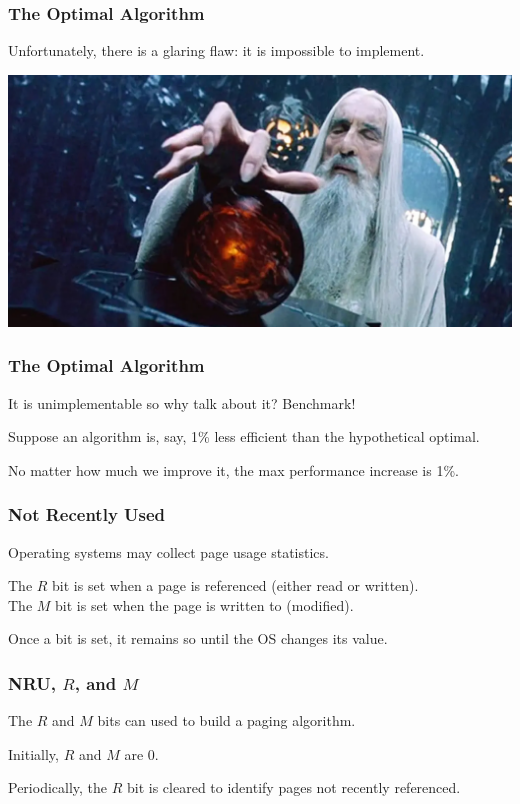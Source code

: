 \begin{frame}
\frametitle{The Optimal Algorithm}

Unfortunately, there is a glaring flaw: it is impossible to implement. 

\begin{center}
	\includegraphics[width=\textwidth]{images/palantir.jpg}
\end{center}

\end{frame}

\begin{frame}
\frametitle{The Optimal Algorithm}

It is unimplementable so why talk about it? Benchmark!

Suppose an algorithm is, say, 1\% less efficient than the hypothetical optimal.

No matter how much we improve it, the max performance increase is 1\%.

\end{frame}




\begin{frame}
\frametitle{Not Recently Used}

Operating systems may collect page usage statistics. 


The $R$ bit is set when a page is referenced (either read or written).\\
The $M$ bit is set when the page is written to (modified). 

Once a bit is set, it remains so until the OS changes its value. 

\end{frame}

\begin{frame}
\frametitle{NRU, $R$, and $M$}

The $R$ and $M$ bits can used to build a paging algorithm.

Initially, $R$ and $M$ are 0. 

Periodically, the $R$ bit is cleared to identify pages not recently referenced. 

\end{frame}



